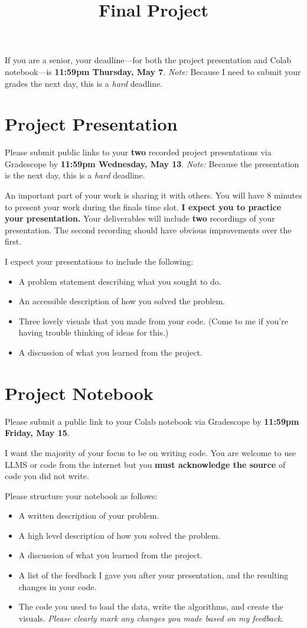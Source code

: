 \documentclass{article}
\title{Final Project}
\date{}
\begin{document}
\maketitle

\noindent If you are a senior, your deadline---for both the project presentation and Colab notebook---is \textbf{11:59pm Thursday, May 7}. \textit{Note:} Because I need to submit your grades the next day, this is a \textit{hard} deadline.

\section{Project Presentation}
Please submit public links to your \textbf{two} recorded project presentations via Gradescope by \textbf{11:59pm Wednesday, May 13}. \textit{Note:} Because the presentation is the next day, this is a \textit{hard} deadline. 

An important part of your work is sharing it with others.
You will have 8 minutes to present your work during the finals time slot.
\textbf{I expect you to practice your presentation.}
Your deliverables will include \textbf{two} recordings of your presentation.
The second recording should have obvious improvements over the first.

I expect your presentations to include the following:
\begin{itemize}
    \item A problem statement describing what you sought to do.
    \item An accessible description of how you solved the problem.
    \item Three lovely visuals that you made from your code.
    (Come to me if you're having trouble thinking of ideas for this.)
    \item A discussion of what you learned from the project.
\end{itemize}

\section{Project Notebook}
Please submit a public link to your Colab notebook via Gradescope by \textbf{11:59pm Friday, May 15}.

I want the majority of your focus to be on writing code.
You are welcome to use LLMS or code from the internet but you \textbf{must acknowledge the source} of code you did not write.

Please structure your notebook as follows:
\begin{itemize}
    \item A written description of your problem.
    \item A high level description of how you solved the problem.
    \item A discussion of what you learned from the project.
    \item A list of the feedback I gave you after your presentation, and the resulting changes in your code.
    \item The code you used to load the data, write the algorithms, and create the visuals.
    \textit{Please clearly mark any changes you made based on my feedback.}
\end{itemize}
\end{document}
